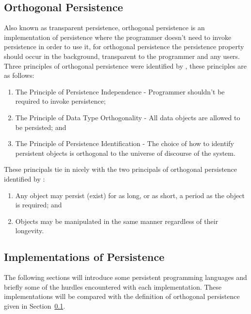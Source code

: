 \documentclass[a4paper,12pt]{article}
\begin{document}
\subsection{Orthogonal Persistence}\label{sec:orthogonal}
Also known as transparent persistence, orthogonal persistence is an implementation of persistence where the programmer doesn't need to invoke persistence in order to use it, for orthogonal persistence the persistence property should occur in the background, transparent to the programmer and any users.
Three principles of orthogonal persistence were identified by \citet{Atkinson}, these principles are as follows:
\begin{enumerate}
    \item{The Principle of Persistence Independence - Programmer shouldn't be required to invoke persistence;}
    \item{The Principle of Data Type Orthogonality - All data objects are allowed to be persisted; and}
    \item{The Principle of Persistence Identification - The choice of how to identify persistent objects is orthogonal to the universe of discourse of the system.}
\end{enumerate}
These principals tie in nicely with the two principals of orthogonal persistence identified by \citet{Grasshopper}:
\begin{enumerate}
    \item{Any object may persist (exist) for as long, or as short, a period as the object is required; and}
    \item{Objects may be manipulated in the same manner regardless of their longevity.}
\end{enumerate}
\subsection{Implementations of Persistence}\label{sec:persistentLanguages}
The following sections will introduce some persistent programming languages and briefly some of the hurdles encountered with each implementation. These implementations will be compared with the definition of orthogonal persistence given in Section~\ref{sec:orthogonal}.
\end{document}

